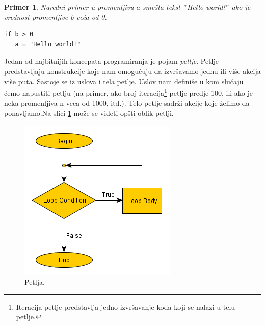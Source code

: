 \documentclass[a4paper]{article}
\newtheorem{primer}{Primer}[section]
\begin{document}
\begin{primer}
Naredni primer u promenljivu $a$ smešta tekst $"$Hello world!$"$ ako je vrednost promenljive b veća od 0.
\begin{verbatim}
if b > 0
   a = "Hello world!"
\end{verbatim}
\end{primer}

Jedan od najbitnijih koncepata programiranja je pojam {\em petlje}. Petlje predstavljaju konstrukcije koje nam omogućuju da izvršavamo jednu ili više akcija više puta. Sastoje se iz uslova i tela petlje. Uslov nam definiše u kom slučaju ćemo napustiti petlju (na primer, ako broj iteracija\footnote{Iteracija petlje predstavlja jedno izvršavanje koda koji se nalazi u telu petlje.} petlje predje 100, ili ako je neka promenljiva n veca od 1000, itd.). Telo petlje sadrži akcije koje želimo da ponavljamo.Na slici \ref{fig:loops} može se videti opšti oblik petlji.
\begin{figure}[h!]
\begin{center}
\includegraphics[scale=0.5]{pictures/Loops.png}
\end{center}
\caption{Petlja.}
\label{fig:loops}
\end{figure}
\end{document}

